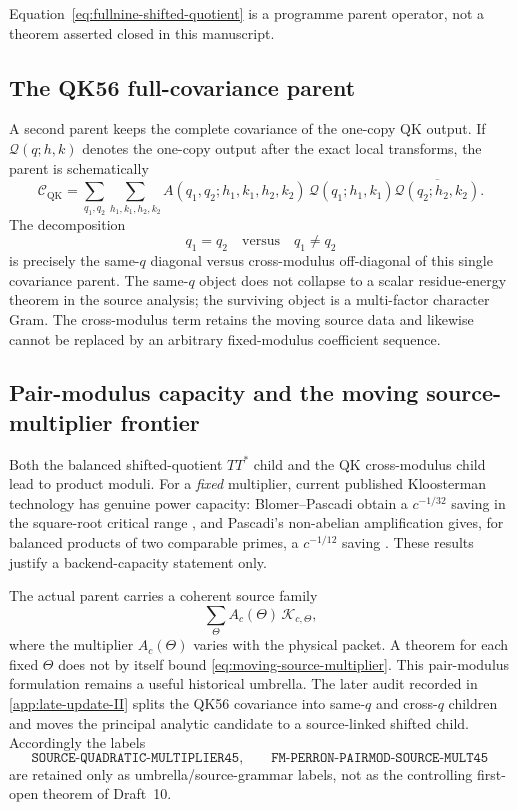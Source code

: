 \documentclass[11pt]{article}
\theoremstyle{definition}
\newcommand{\1}{\mathbf 1}
\begin{document}
Equation~\eqref{eq:fullnine-shifted-quotient} is a programme parent operator,
not a theorem asserted closed in this manuscript.

\subsection{The QK56 full-covariance parent}
A second parent keeps the complete covariance of the one-copy QK output.  If
$\mathcal Q(q;h,k)$ denotes the one-copy output after the exact local
transforms, the parent is schematically
\begin{equation}
   \mathcal C_{\mathrm{QK}}
   =\sum_{q_1,q_2}\sum_{h_1,k_1,h_2,k_2}
      A(q_1,q_2;h_1,k_1,h_2,k_2)\,
      \mathcal Q(q_1;h_1,k_1)\overline{\mathcal Q(q_2;h_2,k_2)}.
   \label{eq:qk56-covariance}
\end{equation}
The decomposition
\[
   q_1=q_2 \quad\text{versus}\quad q_1\ne q_2
\]
is precisely the same-$q$ diagonal versus cross-modulus off-diagonal of this
single covariance parent.  The same-$q$ object does not collapse to a scalar
residue-energy theorem in the source analysis; the surviving object is a
multi-factor character Gram.  The cross-modulus term retains the moving
source data and likewise cannot be replaced by an arbitrary fixed-modulus
coefficient sequence.

\subsection{Pair-modulus capacity and the moving source-multiplier frontier}
Both the balanced shifted-quotient $TT^*$ child and the QK cross-modulus child
lead to product moduli.  For a \emph{fixed} multiplier, current published
Kloosterman technology has genuine power capacity: Blomer--Pascadi obtain a
$c^{-1/32}$ saving in the square-root critical range
\cite{BlomerPascadi2026}, and Pascadi's non-abelian amplification gives, for
balanced products of two comparable primes, a $c^{-1/12}$ saving
\cite{Pascadi2025}.  These results justify a backend-capacity statement only.

The actual parent carries a coherent source family
\begin{equation}
    \sum_{\Theta} A_c(\Theta)\,\mathcal K_{c,\Theta},
    \label{eq:moving-source-multiplier}
\end{equation}
where the multiplier $A_c(\Theta)$ varies with the physical packet.  A theorem
for each fixed $\Theta$ does not by itself bound
\eqref{eq:moving-source-multiplier}.  This pair-modulus formulation remains a
useful historical umbrella.  The later audit recorded in
\cref{app:late-update-II} splits the QK56 covariance into same-$q$ and cross-$q$
children and moves the principal analytic candidate to a source-linked shifted
child.  Accordingly the labels
\[
   \texttt{SOURCE-QUADRATIC-MULTIPLIER45},\qquad
   \texttt{FM-PERRON-PAIRMOD-SOURCE-MULT45}
\]
are retained only as umbrella/source-grammar labels, not as the controlling
first-open theorem of Draft~10.
\end{document}
